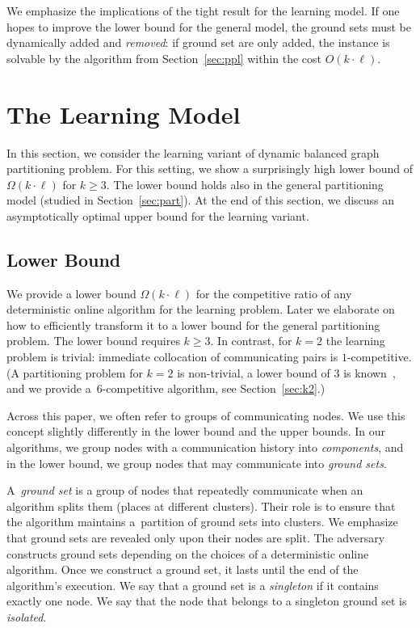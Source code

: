 \documentclass[a4paper,anonymous,USenglish]{lipics-v2019}
\begin{document}
We emphasize the implications of the tight result for the learning model.
If one hopes to improve the lower bound for the general model, the ground sets must be dynamically added and \emph{removed}: if ground set are only added, the instance is solvable by the algorithm from Section~\ref{sec:ppl} within the cost $O(k\cdot \ell)$.

\section{The Learning Model} %

In this section, we consider the learning variant of dynamic balanced graph partitioning problem.
For this setting, we show a surprisingly high lower bound of $\Omega(k \cdot \ell)$ for $k\geq 3$.
The lower bound holds also in the general partitioning model (studied in Section~\ref{sec:part}).
At the end of this section, we discuss an asymptotically optimal upper bound for the learning variant.


\subsection{Lower Bound}

\label{sec:lowerbound}


We provide a lower bound $\Omega(k\cdot \ell)$ for the competitive ratio of any deterministic online algorithm for the learning problem.
Later we elaborate on how to efficiently transform it to a lower bound for the general partitioning problem.
The lower bound requires $k\geq 3$.
In contrast, for $k=2$ the learning problem is trivial: immediate collocation of communicating pairs is $1$-competitive.
(A partitioning problem for $k=2$ is non-trivial, a lower bound of $3$ is known~\cite{repartition-disc}, and we provide a~$6$-competitive algorithm, see Section~\ref{sec:k2}.)

Across this paper, we often refer to groups of communicating nodes.
We use this concept slightly differently in the lower bound and the upper bounds.
In our algorithms, we group nodes with a communication history into \emph{components}, and in the lower bound, we group nodes that may communicate into \emph{ground sets}.

A~\emph{ground set} is a group of nodes that repeatedly communicate when an algorithm splits them (places at different clusters).
Their role is to ensure that the algorithm maintains a~partition of ground sets into clusters.
We emphasize that ground sets are revealed only upon their nodes are split.
The adversary constructs ground sets depending on the choices of a deterministic online algorithm.
Once we construct a ground set, it lasts until the end of the algorithm's execution.
We say that a ground set is a \emph{singleton} if it contains exactly one node.
We say that the node that belongs to a singleton ground set is \emph{isolated}.
\end{document}
